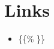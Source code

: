 \documentclass[11pt]{article}
\author{hades}
\date{\today}
\title{}
\begin{document}
\tableofcontents

\setcounter{tocdepth}{2}
\tableofcontents

\section{Links}
\label{sec:orgd8fe53b}
\begin{itemize}
\item \{\{\% \}\}
\end{itemize}
\end{document}
